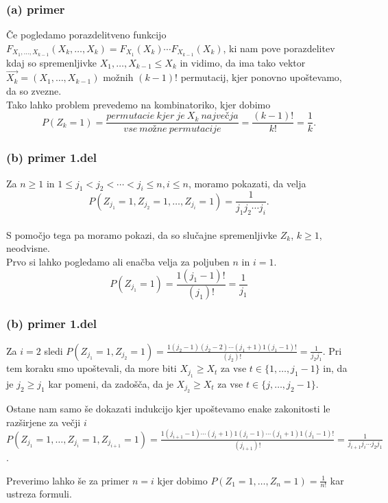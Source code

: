 \documentclass[12pt, hyperref={unicode}]{beamer}
\begin{document}
\begin{frame}
  
  \frametitle{(a) primer}
  Če pogledamo porazdelitveno funkcijo $F_{X_1, \dots , X_{k-1}}(X_k, \dots , X_k)=F_{X_1}(X_k) \cdots F_{X_{k-1}}(X_k)$,
  ki nam pove porazdelitev kdaj so spremenljivke $X_1, \dots , X_{k-1} \leq X_k$ in vidimo,
  da ima tako vektor $\overrightarrow{X_k}=(X_1, \dots , X_{k-1})$ možnih $(k-1)!$ permutacij, kjer ponovno upoštevamo, da so zvezne.\\
  \vspace{3mm}
  Tako lahko problem prevedemo na kombinatoriko, kjer dobimo
  $$P(Z_k=1)= \frac{permutacie \: kjer\: je \: X_k \: največja}{vse \: možne \: permutacije} = \frac{(k-1)!}{k!} = \frac{1}{k}.$$

\end{frame}

\begin{frame}
   
  \frametitle{(b) primer 1.del}
  Za $n \geq 1$ in $1 \leq j_1 < j_2 < \cdots < j_i \leq n, i \leq n$, moramo pokazati, da velja 
  $$P(Z_{j_1} = 1, Z_{j_2} = 1, \dots, Z_{j_i} = 1) = \frac{1}{j_1j_2 \cdots j_i} .$$\\
  S pomočjo tega pa moramo pokazi, da so slučajne spremenljivke $Z_k$, $k \geq 1$, neodvisne.\\
  \vspace{5mm}
  Prvo si lahko pogledamo ali enačba velja za poljuben $n$ in $i=1$.\\
  $$P(Z_{j_1}=1)=\frac{1(j_1-1)!}{(j_1)!}=\frac{1}{j_1}$$

\end{frame}

\begin{frame}

  \frametitle{(b) primer 1.del}
  Za $i=2$ sledi $P(Z_{j_1}=1,Z_{j_2}=1)=\frac{1(j_2-1)(j_2-2)\cdots(j_1+1)1(j_1-1)!}{(j_2)!}=\frac{1}{j_2j_1}$.
  Pri tem koraku smo upoštevali, da more biti $X_{j_1}\geq X_t$ za vse $t\in\{1,\dots,j_1-1\}$ in, da je $j_2\geq j_1$
  kar pomeni, da zadošča, da je $X_{j_2}\geq X_t$ za vse $t\in\{j,\dots,j_2-1\}$.\\
  \vspace{3mm}

  Ostane nam samo še dokazati indukcijo kjer upoštevamo enake zakonitosti le razširjene za večji $i$ $P(Z_{j_1}=1,\dots ,Z_{j_i}=1,Z_{j_{i+1}}=1)=\frac{1(j_{i+1}-1)\cdots(j_i+1)1(j_i-1)\cdots(j_1+1)1(j_1-1)!}{(j_{i+1})!}=\frac{1}{j_{i+1}j_i\cdots j_2j_1}$.\\
  \vspace{3mm}

  Preverimo lahko še za primer $n=i$ kjer dobimo $P(Z_1=1,\dots ,Z_n=1)=\frac{1}{n!}$ kar ustreza formuli.
\end{frame}
\end{document}
